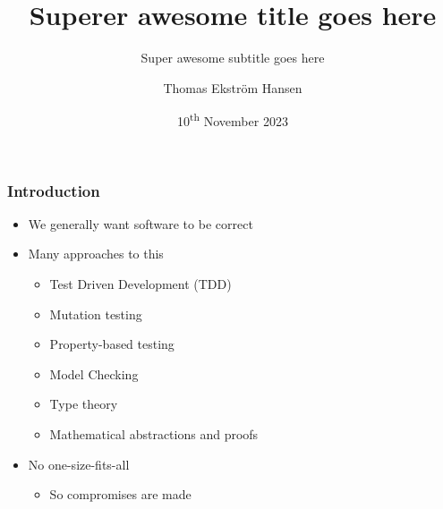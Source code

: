 \documentclass[compress]{beamer}
\title{Superer awesome title goes here}
\subtitle{Super awesome subtitle goes here}
\author{Thomas Ekstr{\" o}m Hansen}
\date{10\textsuperscript{th} November 2023}
\begin{document}
\maketitle

\begin{frame}
  \frametitle{Introduction}

  \begin{itemize}
    \item We generally want software to be correct
    \item Many approaches to this
      \begin{itemize}
        \item Test Driven Development (TDD)
        \item Mutation testing
        \item Property-based testing
        \item Model Checking
        \item Type theory
        \item Mathematical abstractions and proofs
      \end{itemize}
    \item No one-size-fits-all
      \begin{itemize}
        \item So compromises are made
      \end{itemize}
  \end{itemize}

\end{frame}
\end{document}
